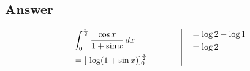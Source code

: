 \documentclass[17pt]{extarticle}
\begin{document}
\begin{fleqn}
\subsection*{Answer}
\begin{equation} \nonumber
\begin{alignedat}{4}
& \int_{0}^{\frac{\pi}{2}} \frac{\cos x}{1 + \sin x}\,dx \\
&= \left[\  \log (1 + \sin x)\right]_{0}^{\frac{\pi}{2}}\\
\end{alignedat}
\quad \quad \quad \quad
\vrule
\quad
\begin{alignedat}{4}
&= \log 2 - \log 1\\
&= \log 2\\
&  \\
\end{alignedat}
\end{equation}


\end{fleqn}
\end{document}
